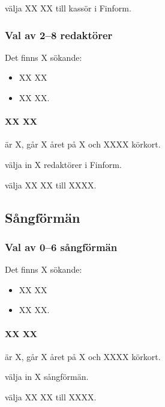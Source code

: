 \documentclass[hidelinks]{sektionsmote}
\begin{document}
\begin{beslut}
  \item välja XX XX till kassör i Finform.
\end{beslut}


\subsubsection{Val av 2--8 redaktörer}
Det finns X sökande:
\begin{itemize}
    \item XX XX
    \item XX XX.
\end{itemize}

\paragraph{XX XX} är X, går X året på X och XXXX körkort.

\begin{beslut}
  \item välja in X redaktörer i Finform.
\end{beslut}
\begin{beslut}
  \item välja XX XX till XXXX.
\end{beslut}


\subsection{Sångförmän}
\subsubsection{Val av 0--6 sångförmän}
Det finns X sökande:
\begin{itemize}
    \item XX XX
    \item XX XX.
\end{itemize}

\paragraph{XX XX} är X, går X året på X och XXXX körkort.

\begin{beslut}
  \item välja in X sångförmän.
\end{beslut}
\begin{beslut}
  \item välja XX XX till XXXX.
\end{beslut}
\end{document}
